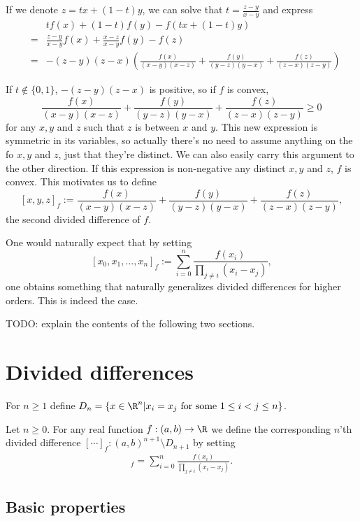 If we denote $z = t x + (1 - t) y$, we can solve that $t = \frac{z - y}{x - y}$ and express
\begin{eqnarray*}
	&& t f(x) + (1 - t) f(y) - f(t x + (1 - t)y) \\
	&=& \frac{z - y}{x - y} f(x) + \frac{x - z}{x - y} f(y) - f(z) \\
	&=& -(z - y)(z - x) \left(\frac{f(x)}{(x - y)(x - z)} + \frac{f(y)}{(y - z)(y - x)} + \frac{f(z)}{(z - x)(z - y)} \right)
\end{eqnarray*}

If $t \notin \{0, 1\}$, $-(z - y)(z - x)$ is positive, so if $f$ is convex,
\[
	\frac{f(x)}{(x - y)(x - z)} + \frac{f(y)}{(y - z)(y - x)} + \frac{f(z)}{(z - x)(z - y)} \geq 0
\]
for any $x, y$ and $z$ such that $z$ is between $x$ and $y$. This new expression is symmetric in its variables, so actually there's no need to assume anything on the fo $x, y$ and $z$, just that they're distinct. We can also easily carry this argument to the other direction. If this expression is non-negative any distinct $x, y$ and $z$, $f$ is convex. This motivates us to define
\[
	[x, y, z]_{f} := \frac{f(x)}{(x - y)(x - z)} + \frac{f(y)}{(y - z)(y - x)} + \frac{f(z)}{(z - x)(z - y)},
\]
the second divided difference of $f$.

One would naturally expect that by setting
\[ 
	[x_{0}, x_{1}, \ldots, x_{n}]_{f} := \sum_{i = 0}^{n} \frac{f(x_{i})}{\prod_{j \neq i} (x_{i} - x_{j})},
\]
one obtains something that naturally generalizes divided differences for higher orders. This is indeed the case.

TODO: explain the contents of the following two sections.

\section{Divided differences}

For $n \geq 1$ define $D_{n} = \{x\in \R^{n} | x_{i} = x_{j} \text{ for some $1 \leq i < j \leq n$}\}$.
\begin{maar}
Let $n \geq 0$. For any real function $f : (a, b) \to \R$ we define the corresponding $n$'th divided difference $[\cdots]_{f} : (a, b)^{n + 1} \setminus D_{n + 1}$ by setting
\begin{align*}
	[x_{0}, x_{1}, \ldots, x_{n}]_{f} = \sum_{i = 0}^{n} \frac{f(x_{i})}{\prod_{j \neq i} (x_{i} - x_{j})}.
\end{align*}
\end{maar}

\subsection{Basic properties}

